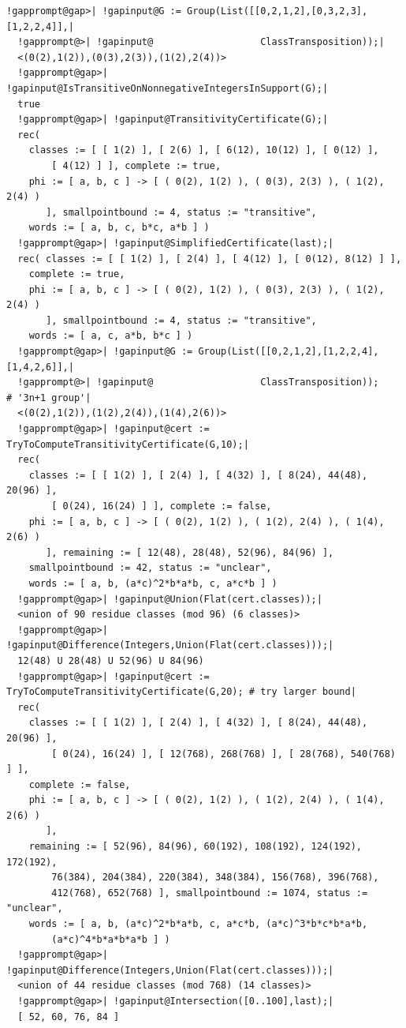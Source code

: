 \documentclass[a4paper,11pt]{report}
\begin{document}
{{\begin{Verbatim}[commandchars=!@|,fontsize=\small,frame=single,label=Example]
  !gapprompt@gap>| !gapinput@G := Group(List([[0,2,1,2],[0,3,2,3],[1,2,2,4]],|
  !gapprompt@>| !gapinput@                   ClassTransposition));|
  <(0(2),1(2)),(0(3),2(3)),(1(2),2(4))>
  !gapprompt@gap>| !gapinput@IsTransitiveOnNonnegativeIntegersInSupport(G);|
  true
  !gapprompt@gap>| !gapinput@TransitivityCertificate(G);|
  rec( 
    classes := [ [ 1(2) ], [ 2(6) ], [ 6(12), 10(12) ], [ 0(12) ], 
        [ 4(12) ] ], complete := true, 
    phi := [ a, b, c ] -> [ ( 0(2), 1(2) ), ( 0(3), 2(3) ), ( 1(2), 2(4) ) 
       ], smallpointbound := 4, status := "transitive", 
    words := [ a, b, c, b*c, a*b ] )
  !gapprompt@gap>| !gapinput@SimplifiedCertificate(last);|
  rec( classes := [ [ 1(2) ], [ 2(4) ], [ 4(12) ], [ 0(12), 8(12) ] ], 
    complete := true, 
    phi := [ a, b, c ] -> [ ( 0(2), 1(2) ), ( 0(3), 2(3) ), ( 1(2), 2(4) ) 
       ], smallpointbound := 4, status := "transitive", 
    words := [ a, c, a*b, b*c ] )
  !gapprompt@gap>| !gapinput@G := Group(List([[0,2,1,2],[1,2,2,4],[1,4,2,6]],|
  !gapprompt@>| !gapinput@                   ClassTransposition));              # '3n+1 group'|
  <(0(2),1(2)),(1(2),2(4)),(1(4),2(6))>
  !gapprompt@gap>| !gapinput@cert := TryToComputeTransitivityCertificate(G,10);|
  rec(
    classes := [ [ 1(2) ], [ 2(4) ], [ 4(32) ], [ 8(24), 44(48), 20(96) ], 
        [ 0(24), 16(24) ] ], complete := false, 
    phi := [ a, b, c ] -> [ ( 0(2), 1(2) ), ( 1(2), 2(4) ), ( 1(4), 2(6) ) 
       ], remaining := [ 12(48), 28(48), 52(96), 84(96) ], 
    smallpointbound := 42, status := "unclear", 
    words := [ a, b, (a*c)^2*b*a*b, c, a*c*b ] )
  !gapprompt@gap>| !gapinput@Union(Flat(cert.classes));|
  <union of 90 residue classes (mod 96) (6 classes)>
  !gapprompt@gap>| !gapinput@Difference(Integers,Union(Flat(cert.classes)));|
  12(48) U 28(48) U 52(96) U 84(96)
  !gapprompt@gap>| !gapinput@cert := TryToComputeTransitivityCertificate(G,20); # try larger bound|
  rec(
    classes := [ [ 1(2) ], [ 2(4) ], [ 4(32) ], [ 8(24), 44(48), 20(96) ], 
        [ 0(24), 16(24) ], [ 12(768), 268(768) ], [ 28(768), 540(768) ] ], 
    complete := false, 
    phi := [ a, b, c ] -> [ ( 0(2), 1(2) ), ( 1(2), 2(4) ), ( 1(4), 2(6) ) 
       ], 
    remaining := [ 52(96), 84(96), 60(192), 108(192), 124(192), 172(192), 
        76(384), 204(384), 220(384), 348(384), 156(768), 396(768), 
        412(768), 652(768) ], smallpointbound := 1074, status := "unclear", 
    words := [ a, b, (a*c)^2*b*a*b, c, a*c*b, (a*c)^3*b*c*b*a*b, 
        (a*c)^4*b*a*b*a*b ] )
  !gapprompt@gap>| !gapinput@Difference(Integers,Union(Flat(cert.classes)));|
  <union of 44 residue classes (mod 768) (14 classes)>
  !gapprompt@gap>| !gapinput@Intersection([0..100],last);|
  [ 52, 60, 76, 84 ]
  

\end{Verbatim}}}
\end{document}
